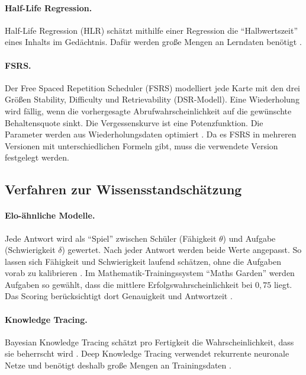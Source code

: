 \paragraph{Half-Life Regression.} Half-Life Regression (HLR) schätzt mithilfe einer Regression die \enquote{Halbwertszeit} eines Inhalts im Gedächtnis. Dafür werden große Mengen an Lerndaten benötigt \parencite{settles2016}.

\paragraph{FSRS.} Der Free Spaced Repetition Scheduler (FSRS) modelliert jede Karte mit den drei Größen Stability, Difficulty und Retrievability (DSR-Modell).
Eine Wiederholung wird fällig, wenn die vorhergesagte Abrufwahrscheinlichkeit auf die gewünschte Behaltensquote sinkt.
Die Vergessenskurve ist eine Potenzfunktion. Die Parameter werden aus Wiederholungsdaten optimiert \parencite{ye2022,su2023,fsrs4anki}.
Da es FSRS in mehreren Versionen mit unterschiedlichen Formeln gibt, muss die verwendete Version festgelegt werden.

\subsection{Verfahren zur Wissensstandschätzung}
\paragraph{Elo-ähnliche Modelle.} Jede Antwort wird als \enquote{Spiel} zwischen Schüler (Fähigkeit $\theta$) und Aufgabe (Schwierigkeit $\delta$) gewertet.
Nach jeder Antwort werden beide Werte angepasst. So lassen sich Fähigkeit und Schwierigkeit laufend schätzen, ohne die Aufgaben vorab zu kalibrieren \parencite{pelanek2016}.
Im Mathematik-Trainingssystem \enquote{Maths Garden} werden Aufgaben so gewählt, dass die mittlere Erfolgswahrscheinlichkeit bei $0{,}75$ liegt. Das Scoring berücksichtigt dort Genauigkeit und Antwortzeit \parencite{klinkenberg2011}.

\paragraph{Knowledge Tracing.} Bayesian Knowledge Tracing schätzt pro Fertigkeit die Wahrscheinlichkeit, dass sie beherrscht wird \parencite{corbett1994}.
Deep Knowledge Tracing verwendet rekurrente neuronale Netze und benötigt deshalb große Mengen an Trainingsdaten \parencite{piech2015}.

